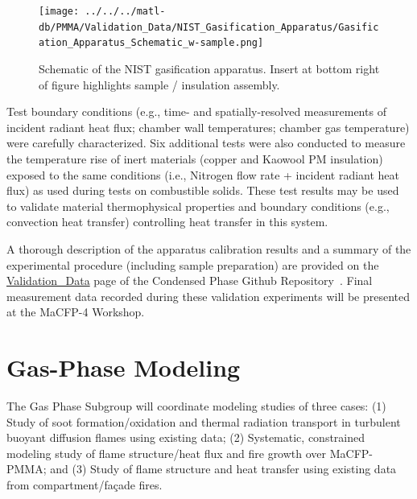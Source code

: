 \documentclass[12pt]{article}
\begin{document}
\begin{figure}
     \centering
         \texttt{[image: ../../../matl-db/PMMA/Validation\_Data/NIST\_Gasification\_Apparatus/Gasification\_Apparatus\_Schematic\_w-sample.png]}
         \caption{ Schematic of the NIST gasification apparatus. Insert at bottom right of figure highlights sample / insulation assembly.}
         \label{fig:NISTGasApp}
\end{figure}
Test boundary conditions (e.g., time- and spatially-resolved measurements of incident radiant heat flux; chamber wall temperatures; chamber gas temperature) were carefully characterized. Six additional tests were also conducted to measure the temperature rise of inert materials (copper and Kaowool PM insulation) exposed to the same conditions (i.e., Nitrogen flow rate + incident radiant heat flux) as used during tests on combustible solids. These test results may be used to validate material thermophysical properties and boundary conditions (e.g., convection heat transfer) controlling heat transfer in this system.

A thorough description of the apparatus calibration results and a summary of the experimental procedure (including sample preparation) are provided on the \href{https://github.com/MaCFP/matl-db/tree/master/PMMA/Validation_Data/NIST_Gasification_Apparatus}{Validation\_Data} page of the Condensed Phase Github Repository~\cite{MaCFP-cond-db}. Final measurement data recorded during these validation experiments will be presented at the MaCFP-4 Workshop.


\clearpage
\section{Gas-Phase Modeling}
\label{sec:Gas Phase}
The Gas Phase Subgroup will coordinate modeling studies of three cases: (1) Study of soot formation/oxidation and thermal radiation transport in turbulent buoyant diffusion flames using existing data; (2) Systematic, constrained modeling study of flame structure/heat flux and fire growth over MaCFP-PMMA; and (3) Study of flame structure and heat transfer using existing data from compartment/façade fires.
\end{document}
